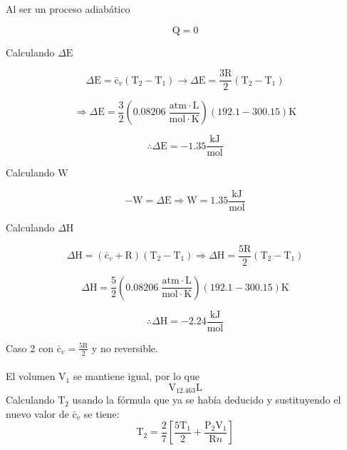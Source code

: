 \documentclass[12pt]{article}
\begin{document}
Al ser un proceso adiabático 

\begin{displaymath}
	\mathrm{Q}=0
\end{displaymath}

Calculando $\Delta\mathrm{E}$

\begin{displaymath}
	\Delta \mathrm{E}=\mathrm{\bar{c}}_v(\mathrm{T}_2-\mathrm{T}_1)\rightarrow \Delta\mathrm{E}=\frac{3\mathrm{R}}{2}\left( \mathrm{T}_2-\mathrm{T}_1 \right)
\end{displaymath}

\begin{displaymath}
	\Rightarrow \Delta\mathrm{E}=\frac{3}{2}\left( 0.08206\; \frac{\mathrm{atm}\cdot\mathrm{L}}{\mathrm{mol}\cdot\mathrm{K}} \right) \left( 192.1-300.15 \right)\mathrm{K}
\end{displaymath}

\begin{displaymath}
	\therefore \Delta\mathrm{E}=-1.35\frac{\mathrm{kJ}}{\mathrm{mol}}
\end{displaymath}

Calculando $\mathrm{W}$

\begin{displaymath}
	-\mathrm{W}=\Delta\mathrm{E}\Rightarrow \mathrm{W}=1.35\frac{\mathrm{kJ}}{\mathrm{mol}}
\end{displaymath}

Calculando $\Delta\mathrm{H}$

\begin{displaymath}
	\Delta\mathrm{H}=(\mathrm{\bar{c}}_v+\mathrm{R})(\mathrm{T}_2-\mathrm{T}_1)\Rightarrow \Delta\mathrm{H}=\frac{5\mathrm{R}}{2}(\mathrm{T}_2-\mathrm{T}_1)
\end{displaymath}

\begin{displaymath}
	\Delta\mathrm{H}=\frac{5}{2}\left( 0.08206\; \frac{\mathrm{atm}\cdot\mathrm{L}}{\mathrm{mol}\cdot\mathrm{K}} \right)\left( 192.1-300.15 \right)\mathrm{K}
\end{displaymath}

\begin{displaymath}
	\therefore \Delta\mathrm{H}=-2.24 \frac{\mathrm{kJ}}{\mathrm{mol}}
\end{displaymath}

Caso 2 con $\mathrm{\bar{c}}_v=\frac{5\mathrm{R}}{2}$ y no reversible.\\
\\
El volumen $\mathrm{V}_1$ se mantiene igual, por lo que
\begin{displaymath}
	\mathrm{V}_12.463\mathrm{L}
\end{displaymath}
Calculando $\mathrm{T}_2$ usando la fórmula que ya se había deducido y sustituyendo el nuevo valor de $\mathrm{\bar{c}}_v$ se tiene:
\begin{displaymath}
	\mathrm{T}_2=\frac{2}{7}\left[ \frac{5\mathrm{T}_1}{2}+\frac{\mathrm{P}_2\mathrm{V}_1}{\mathrm{R}n} \right]
\end{displaymath}
\end{document}

